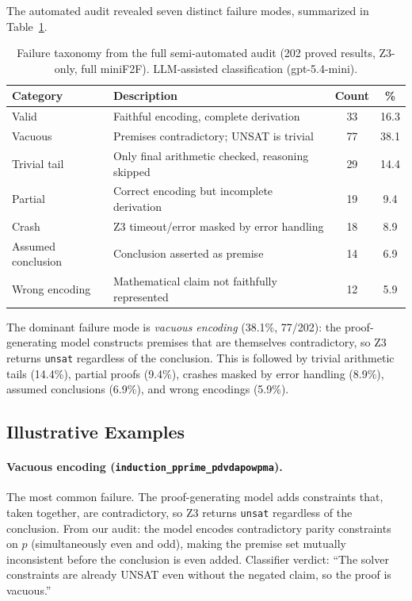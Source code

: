 \documentclass[11pt]{article}
\begin{document}
The automated audit revealed seven distinct failure modes, summarized in Table~\ref{tab:taxonomy}.

\begin{table}[t]
\centering
\caption{Failure taxonomy from the full semi-automated audit (202 proved results, Z3-only, full miniF2F). LLM-assisted classification (gpt-5.4-mini).}
\label{tab:taxonomy}
\small
\begin{tabular}{@{}llcc@{}}
\toprule
\textbf{Category} & \textbf{Description} & \textbf{Count} & \textbf{\%} \\
\midrule
Valid & Faithful encoding, complete derivation & 33 & 16.3 \\
Vacuous & Premises contradictory; UNSAT is trivial & 77 & 38.1 \\
Trivial tail & Only final arithmetic checked, reasoning skipped & 29 & 14.4 \\
Partial & Correct encoding but incomplete derivation & 19 & 9.4 \\
Crash & Z3 timeout/error masked by error handling & 18 & 8.9 \\
Assumed conclusion & Conclusion asserted as premise & 14 & 6.9 \\
Wrong encoding & Mathematical claim not faithfully represented & 12 & 5.9 \\
\bottomrule
\end{tabular}
\end{table}

The dominant failure mode is \emph{vacuous encoding} (38.1\%, 77/202): the proof-generating model constructs premises that are themselves contradictory, so Z3 returns \texttt{unsat} regardless of the conclusion. This is followed by trivial arithmetic tails (14.4\%), partial proofs (9.4\%), crashes masked by error handling (8.9\%), assumed conclusions (6.9\%), and wrong encodings (5.9\%).

\subsection{Illustrative Examples}

\paragraph{Vacuous encoding (\texttt{induction\_pprime\_pdvdapowpma}).} The most common failure. The proof-generating model adds constraints that, taken together, are contradictory, so Z3 returns \texttt{unsat} regardless of the conclusion. From our audit: the model encodes contradictory parity constraints on $p$ (simultaneously even and odd), making the premise set mutually inconsistent before the conclusion is even added. Classifier verdict: ``The solver constraints are already UNSAT even without the negated claim, so the proof is vacuous.''
\end{document}
